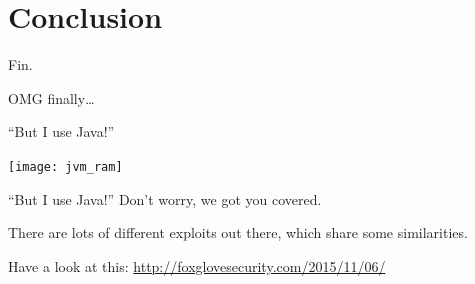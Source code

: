 \documentclass[beamer]{uibk}
\begin{document}
\section*{Conclusion}

\begin{frame}{Fin.}
   \begin{center}
       \huge OMG finally\dots
   \end{center}
\end{frame}

\begin{frame}{``But I use Java!''}
    \begin{center}
        \texttt{[image: jvm\_ram]}
    \end{center}
\end{frame}

\begin{frame}{``But I use Java!''}
    Don't worry, we got you covered.
    \bigskip

    There are lots of different exploits out there, which share some
    similarities.
    \bigskip

    Have a look at this: \url{http://foxglovesecurity.com/2015/11/06/}
\end{frame}
\end{document}
